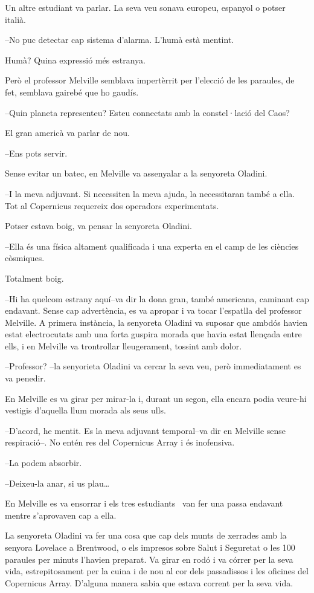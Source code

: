 Un altre estudiant va parlar. La seva veu sonava europeu, espanyol o
potser italià.

--No puc detectar cap sistema d'alarma. L'humà està mentint.

Humà? Quina expressió més estranya.

Però el professor Melville semblava impertèrrit per l'elecció de les
paraules, de fet, semblava gairebé que ho gaudís.

--Quin planeta representeu? Esteu connectats amb la constel·lació del
Caos?

El gran americà va parlar de nou.

--Ens pots servir.

Sense evitar un batec, en Melville va assenyalar a la senyoreta Oladini.

--I la meva adjuvant. Si necessiten la meva ajuda, la necessitaran també
a ella. Tot al Copernicus requereix dos operadors experimentats.

Potser estava boig, va pensar la senyoreta Oladini.

--Ella és una física altament qualificada i una experta en el camp de
les ciències còsmiques.

Totalment boig.

--Hi ha quelcom estrany aquí--va dir la dona gran, també americana,
caminant cap endavant. Sense cap advertència, es va apropar i va tocar
l'espatlla del professor Melville. A primera instància, la senyoreta
Oladini va suposar que ambdós havien estat electrocutats amb una forta
guspira morada que havia estat llençada entre ells, i en Melville va
trontrollar lleugerament, tossint amb dolor.

--Professor? --la senyorieta Oladini va cercar la seva veu, però
immediatament es va penedir.

En Melville es va girar per mirar-la i, durant un segon, ella encara
podia veure-hi vestigis d'aquella llum morada als seus ulls.

--D'acord, he mentit. Es la meva adjuvant temporal--va dir en Melville
sense respiració--. No entén res del Copernicus Array i és inofensiva.

--La podem absorbir.

--Deixeu-la anar, si us plau\ldots{}

En Melville es va ensorrar i els tres estudiants ~van fer una passa
endavant mentre s'aprovaven cap a ella.

La senyoreta Oladini va fer una cosa que cap dels munts de xerrades amb
la senyora Lovelace a Brentwood, o els impresos sobre Salut i Seguretat
o les 100 paraules per minuts l'havien preparat. Va girar en rodó i va
córrer per la seva vida, estrepitosament per la cuina i de nou al cor
dels passadissos i les oficines del Copernicus Array. D'alguna manera
sabia que estava corrent per la seva vida.

